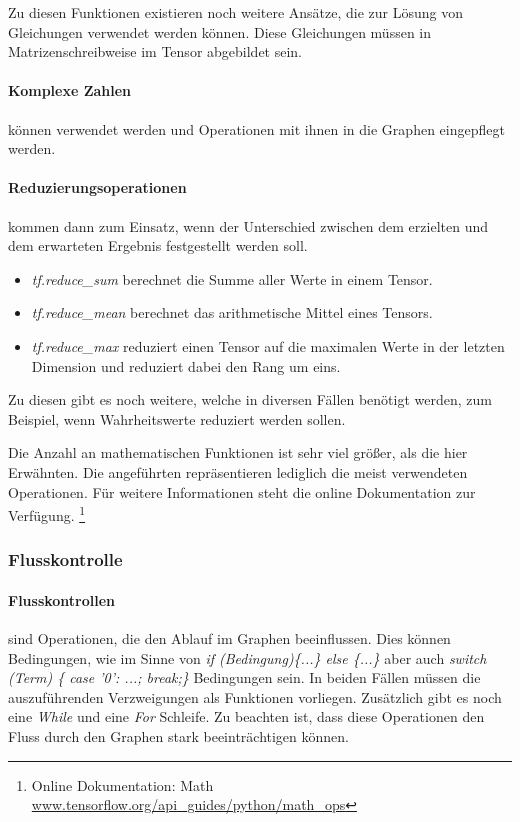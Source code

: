 \noindent
Zu diesen Funktionen existieren noch weitere Ansätze, die zur Lösung von Gleichungen verwendet werden können. 
Diese Gleichungen müssen in Matrizenschreibweise im Tensor abgebildet sein. 

\paragraph{Komplexe Zahlen} können verwendet werden und Operationen mit ihnen in die Graphen eingepflegt werden. 

\paragraph{Reduzierungsoperationen} kommen dann zum Einsatz, wenn der Unterschied zwischen dem erzielten und dem erwarteten Ergebnis festgestellt werden soll. 
\begin{itemize}
	\item \textit{tf.reduce\_sum} berechnet die Summe aller Werte in einem Tensor.
	\item \textit{tf.reduce\_mean} berechnet das arithmetische Mittel eines Tensors. 
	\item \textit{tf.reduce\_max} reduziert einen Tensor auf die maximalen Werte in der letzten Dimension und reduziert dabei den Rang um eins.
\end{itemize}

\noindent
Zu diesen gibt es noch weitere, welche in diversen Fällen benötigt werden, zum Beispiel, wenn Wahrheitswerte reduziert werden sollen. \newline

\noindent
Die Anzahl an mathematischen Funktionen ist sehr viel größer, als die hier Erwähnten. 
Die angeführten repräsentieren lediglich die meist verwendeten Operationen. 
Für weitere Informationen steht die online Dokumentation zur Verfügung. \footnote{Online Dokumentation: Math  \url{www.tensorflow.org/api_guides/python/math_ops}}

\subsubsection{Flusskontrolle}

\paragraph{Flusskontrollen} sind Operationen, die den Ablauf im Graphen beeinflussen. 
Dies können Bedingungen, wie im Sinne von \textit{if (Bedingung)\{...\} else \{...\}} aber auch \textit{switch (Term) \{ case '0': ...; break;\}} Bedingungen sein. 
In beiden Fällen müssen die auszuführenden Verzweigungen als Funktionen vorliegen. 
Zusätzlich gibt es noch eine \textit{While} und eine \textit{For} Schleife. 
Zu beachten ist, dass diese Operationen den Fluss durch den Graphen stark beeinträchtigen können.


